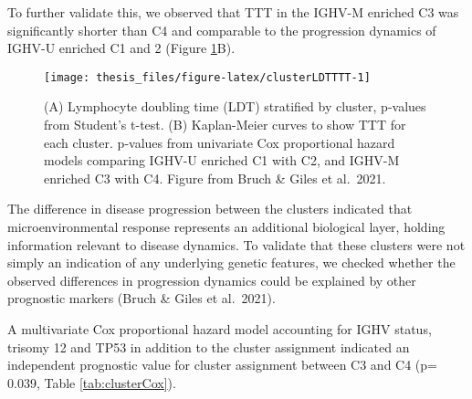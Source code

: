 \documentclass[11pt, a4paper, twosided]{book}
\begin{document}
To further validate this, we observed that TTT in the IGHV-M enriched C3 was significantly shorter than C4 and comparable to the progression dynamics of IGHV-U enriched C1 and 2 (Figure \ref{fig:clusterLDTTTT}B).


\begin{figure}

{\centering \texttt{[image: thesis\_files/figure-latex/clusterLDTTTT-1]} 

}

\caption{(A) Lymphocyte doubling time (LDT) stratified by cluster, p-values from Student's t-test. (B) Kaplan-Meier curves to show TTT for each cluster. p-values from univariate Cox proportional hazard models comparing IGHV-U enriched C1 with C2, and IGHV-M enriched C3 with C4. Figure from Bruch \& Giles et al.~2021.}\label{fig:clusterLDTTTT}
\end{figure}
The difference in disease progression between the clusters indicated that microenvironmental response represents an additional biological layer, holding information relevant to disease dynamics. To validate that these clusters were not simply an indication of any underlying genetic features, we checked whether the observed differences in progression dynamics could be explained by other prognostic markers (Bruch \& Giles et al.~2021).

A multivariate Cox proportional hazard model accounting for IGHV status, trisomy 12 and TP53 in addition to the cluster assignment indicated an independent prognostic value for cluster assignment between C3 and C4 (p= 0.039, Table \ref{tab:clusterCox}).
\end{document}

